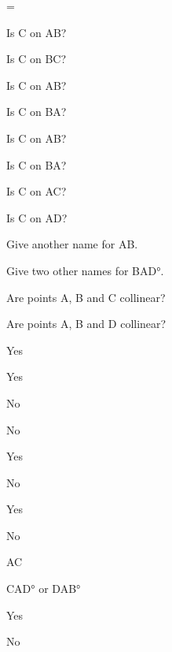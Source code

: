 \begin{exercises}
\begin{ex}
	\begin{exparts} \itemsep = \smallskipamount
	\begin{multicols}{2}
	\item Is \pnt C on \lin AB?
	\item Is \pnt C on \lin BC? 
	\item Is \pnt C on \seg AB?
	\item Is \pnt C on \seg BA? 
	\item Is \pnt C on \ray AB?
	\item Is \pnt C on \ray BA?
	\item Is \pnt C on \seg AC?
	\item Is \pnt C on \lin AD? 
	\item Give another name for \ray AB. 
	\item Give two other names for \ang {BAD}.
	\item Are points \pnt A, \pnt B and \pnt C collinear?
	\item Are points \pnt A, \pnt B and \pnt D collinear?
	\end{multicols}
	\end{exparts}
	
	\begin{center}
	\end{center}

	\begin{sol}
		\hspace*{\fill}
		\begin{exparts} 
			\item Yes
			\item Yes
			\item No
			\item No
			\item Yes
			\item No
			\item Yes
			\item No
			\item \ray AC
			\item \ang {CAD} or \ang {DAB}
			\item Yes
			\item No
		\end{exparts}
	\end{sol}
	\end{ex}
	

\end{exercises}
